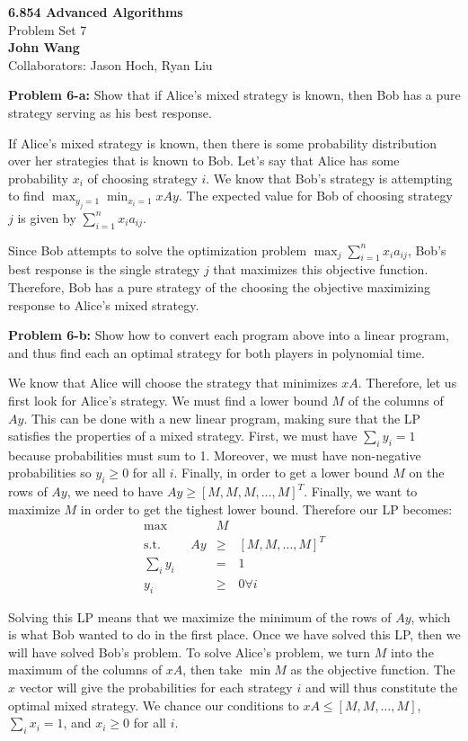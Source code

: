 \documentclass[psamsfonts]{amsart}
\newenvironment{sol}{\vspace{0.25cm}{\large \bfseries Solution:}}{\qedsymbol}
\newenvironment{prob}[1]{\begin{framed}{\large \bfseries Problem #1:}}{\end{framed}}
\newcommand{\makenewtitle}{
    \begin{center}
    {\huge \bfseries 6.854 Advanced Algorithms} \\
    Problem Set 7\\
    \vspace{0.25cm}
    {\bfseries John Wang} \\
    Collaborators: Jason Hoch, Ryan Liu 
    \end{center}
    \vspace{0.5cm}
}
\begin{document}
\newpage
\makenewtitle

\begin{prob}{6-a}
Show that if Alice's mixed strategy is known, then Bob has a pure strategy serving as his best response.
\end{prob}
\begin{sol}
If Alice's mixed strategy is known, then there is some probability distribution over her strategies that is known to Bob. Let's say that Alice has some probability $x_i$ of choosing strategy $i$. We know that Bob's strategy is attempting to find $\max_{y_j = 1} \min_{x_i = 1} xAy$. The expected value for Bob of choosing strategy $j$ is given by $\sum_{i=1}^n x_i a_{ij}$. 

Since Bob attempts to solve the optimization problem $\max_{j} \sum_{i=1}^n x_i a_{ij}$, Bob's best response is the single strategy $j$ that maximizes this objective function. Therefore, Bob has a pure strategy of the choosing the objective maximizing response to Alice's mixed strategy.
\end{sol}

\begin{prob}{6-b}
Show how to convert each program above into a linear program, and thus find each an optimal strategy for both players in polynomial time.
\end{prob}
\begin{sol}
We know that Alice will choose the strategy that minimizes $xA$. Therefore, let us first look for Alice's strategy. We must find a lower bound $M$ of the columns of $Ay$. This can be done with a new linear program, making sure that the LP satisfies the properties of a mixed strategy. First, we must have $\sum_{i} y_i = 1$ because probabilities must sum to 1. Moreover, we must have non-negative probabilities so $y_i \geq 0$ for all $i$. Finally, in order to get a lower bound $M$ on the rows of $Ay$, we need to have $Ay \geq [M, M, M, \ldots, M]^T$. Finally, we want to maximize $M$ in order to get the tighest lower bound. Therefore our LP becomes:
\begin{eqnarray}
\max &M& \\ 
\text{s.t.} \hspace{1cm} Ay &\geq& [M, M, \ldots, M]^T \\
\sum_i y_i &=& 1 \\
y_i &\geq& 0 \forall i
\end{eqnarray}

Solving this LP means that we maximize the minimum of the rows of $Ay$, which is what Bob wanted to do in the first place. Once we have solved this LP, then we will have solved Bob's problem. To solve Alice's problem, we turn $M$ into the maximum of the columns of $xA$, then take $\min M$ as the objective function. The $x$ vector will give the probabilities for each strategy $i$ and will thus constitute the optimal mixed strategy. We chance our conditions to $xA \leq [M, M, \ldots, M]$, $\sum_{i} x_i = 1$, and $x_i \geq 0$ for all $i$.  
\end{sol}
\end{document}
